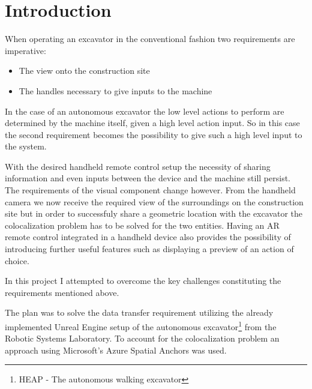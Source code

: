 \chapter{Introduction}
\label{ch:introduction}


When operating an excavator in the conventional fashion two requirements are imperative: \begin{itemize}
    \item The view onto the construction site
    \item The handles necessary to give inputs to the machine
\end{itemize}
In the case of an autonomous excavator the low level actions to perform are determined by the machine itself, given a high level action input. So in this case the second requirement becomes the possibility to give such a high level input to the system.

With the desired handheld remote control setup the necessity of sharing information and even inputs between the device and the machine still persist. The requirements of the visual component change however. From the handheld camera we now receive the required view of the surroundings on the construction site but in order to successfuly share a geometric location with the excavator the colocalization problem has to be solved for the two entities. Having an AR remote control integrated in a handheld device also provides the possibility of introducing further useful features such as displaying a preview of an action of choice. 

In this project I attempted to overcome the key challenges constituting the requirements mentioned above. 

The plan was to solve the data transfer requirement utilizing the already implemented Unreal Engine setup of the autonomous excavator\footnote{HEAP - The autonomous walking excavator\citep*{heap}} from the Robotic Systems Laboratory. To account for the colocalization problem an approach using Microsoft's Azure Spatial Anchors was used.